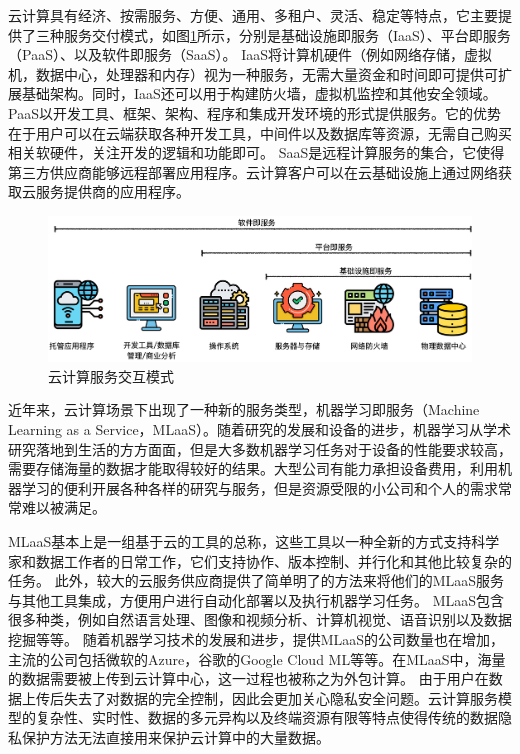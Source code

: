 云计算具有经济、按需服务、方便、通用、多租户、灵活、稳定等特点，它主要提供了三种服务交付模式，如图\ref{img_saas}所示，分别是基础设施即服务（IaaS）、平台即服务（PaaS）、以及软件即服务（SaaS）。
IaaS将计算机硬件（例如网络存储，虚拟机，数据中心，处理器和内存）视为一种服务，无需大量资金和时间即可提供可扩展基础架构。同时，IaaS还可以用于构建防火墙，虚拟机监控和其他安全领域\cite{manvi2014resource}。
PaaS以开发工具、框架、架构、程序和集成开发环境的形式提供服务。它的优势在于用户可以在云端获取各种开发工具，中间件以及数据库等资源，无需自己购买相关软硬件，关注开发的逻辑和功能即可。
SaaS是远程计算服务的集合，它使得第三方供应商能够远程部署应用程序。云计算客户可以在云基础设施上通过网络获取云服务提供商的应用程序\cite{antonopoulos2010cloud}。

\begin{figure}[htbp]
	\centering
	\includegraphics[width=1.0\linewidth]{img/cloudservice.png}
	\caption{云计算服务交互模式}
	\label{img_saas}
\end{figure}

近年来，云计算场景下出现了一种新的服务类型，机器学习即服务（Machine Learning as a Service，MLaaS）\cite{ribeiro2015mlaas}。随着研究的发展和设备的进步，机器学习从学术研究落地到生活的方方面面，但是大多数机器学习任务对于设备的性能要求较高，需要存储海量的数据才能取得较好的结果。大型公司有能力承担设备费用，利用机器学习的便利开展各种各样的研究与服务，但是资源受限的小公司和个人的需求常常难以被满足。

MLaaS基本上是一组基于云的工具的总称，这些工具以一种全新的方式支持科学家和数据工作者的日常工作，它们支持协作、版本控制、并行化和其他比较复杂的任务。
此外，较大的云服务供应商提供了简单明了的方法来将他们的MLaaS服务与其他工具集成，方便用户进行自动化部署以及执行机器学习任务。
MLaaS包含很多种类，例如自然语言处理、图像和视频分析、计算机视觉、语音识别以及数据挖掘等等。
随着机器学习技术的发展和进步，提供MLaaS的公司数量也在增加，主流的公司包括微软的Azure，谷歌的Google Cloud ML等等。在MLaaS中，海量的数据需要被上传到云计算中心，这一过程也被称之为外包计算。
由于用户在数据上传后失去了对数据的完全控制，因此会更加关心隐私安全问题。云计算服务模型的复杂性、实时性、数据的多元异构以及终端资源有限等特点使得传统的数据隐私保护方法无法直接用来保护云计算中的大量数据\cite{hunt2018chiron}。

